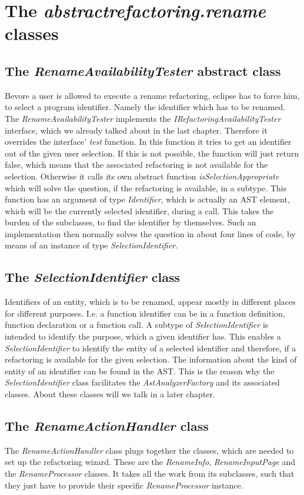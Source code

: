 \documentclass[a4paper,10pt]{report}
\begin{document}
\section{The {\it abstractrefactoring.rename} classes}
\subsection{The {\it RenameAvailabilityTester} abstract class}
Bevore a user is allowed to execute a rename refactoring, eclipse has to force him, to select a program identifier. Namely the identifier which has to be renamed.
The {\it RenameAvailabilityTester} implements the {\it IRefactoringAvailabilityTester} interface, which we already talked about in the last chapter.
Therefore it overrides the interface' {\it test} function. In this function it tries to get an identifier out of the given user selection. If this is not possible, the function will just return false, which means that the associated refactoring is not available for the selection.
Otherwise it calls its own abstract function {\it isSelectionAppropriate} which will solve the question, if the refactoring is available, in a subtype. This function has an argument of type {\it Identifier}, which is actually an AST element, which will be the currently selected identifier, during a call. 
This takes the burden of the subclasses, to find the identifier by themselves.
Such an implementation then normally solves the question in about four lines of code, by means of an instance of type {\it SelectionIdentifier}. 

\subsection{The {\it SelectionIdentifier} class}
Identifiers of an entity, which is to be renamed, appear mostly in different places for different purposes. I.e. a function identifier can be in a function definition, function declaration or a function call. 
A subtype of {\it SelectionIdentifier} is intended to identify the purpose, which a given identifier has.
This enables a {\it SelectionIdentifier} to identify the entity of a selected identifier and therefore, if a refactoring is available for the given selection. The information about the kind of entity of an identifier can  be found in the AST. 
This is the reason why the {\it SelectionIdentifier} class facilitates the {\it AstAnalyzerFactory} and its associated classes. About these classes will we talk in a later chapter.

\subsection{The {\it RenameActionHandler} class}
The {\it RenameActionHandler} class plugs together the classes, which are needed to set up the refactoring wizard. These are the {\it RenameInfo}, {\it RenameInputPage} and the {\it RenameProcessor} classes.
It takes all the work from its subclasses, such that they just have to provide their specific {\it RenameProcessor} instance.
\end{document}
